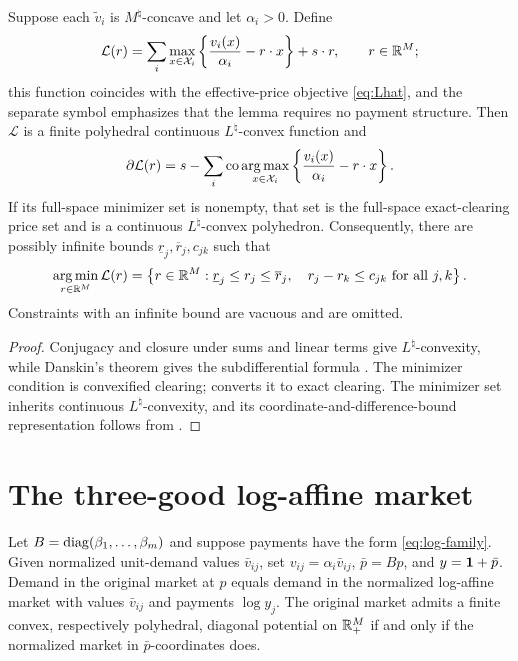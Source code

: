 \begin{lemma}\label{lem:walrasian-price-polyhedron}
Suppose each $\widetilde v_i$ is $M^\natural$-concave and let $\alpha_i>0$. Define
\[
\mathcal L(r)=
\sum_i\max_{x\in\mathcal{X}_i}
\left\{\frac{v_i(x)}{\alpha_i}-r\cdot x\right\}
+s\cdot r,
\qquad r\in\mathbb{R}^M;
\]
this function coincides with the effective-price objective \eqref{eq:Lhat}, and the separate symbol emphasizes that the lemma requires no payment structure. Then $\mathcal L$ is a finite polyhedral continuous $L^\natural$-convex function and
\[
\partial\mathcal L(r)
=s-\sum_i\operatorname{co}\operatorname*{arg\,max}_{x\in\mathcal{X}_i}
\left\{\frac{v_i(x)}{\alpha_i}-r\cdot x\right\}.
\]
If its full-space minimizer set is nonempty, that set is the full-space exact-clearing price set and is a continuous $L^\natural$-convex polyhedron. Consequently, there are possibly infinite bounds $\underline r_j,\overline r_j,c_{jk}$ such that
\[
\operatorname*{arg\,min}_{r\in\mathbb{R}^M}\mathcal L(r)=
\left\{r\in\mathbb{R}^M:
\underline r_j\le r_j\le\overline r_j,
\quad r_j-r_k\le c_{jk}\ \text{for all }j,k
\right\}.
\]
Constraints with an infinite bound are vacuous and are omitted.
\end{lemma}

\begin{proof}
Conjugacy and closure under sums and linear terms give $L^\natural$-convexity, while Danskin's theorem gives the subdifferential formula \citep[Theorems~7.10 and 8.2]{murota2016}. The minimizer condition is convexified clearing;  converts it to exact clearing. The minimizer set inherits continuous $L^\natural$-convexity, and its coordinate-and-difference-bound representation follows from \citet[Theorem~2.2(2)]{moriguchimurota2023}.
\end{proof}

\section{The three-good log-affine market}\label{app:facets}

\begin{lemma}\label{lem:log-normalization}
Let $B=\operatorname{diag}(\beta_1,\ldots,\beta_m)$ and suppose payments have the form \eqref{eq:log-family}. Given normalized unit-demand values $\bar v_{ij}$, set $v_{ij}=\alpha_i\bar v_{ij}$, $\bar p=Bp$, and $y=\mathbf{1}+\bar p$. Demand in the original market at $p$ equals demand in the normalized log-affine market with values $\bar v_{ij}$ and payments $\log y_j$. The original market admits a finite convex, respectively polyhedral, diagonal potential on $\mathbb{R}_+^M$ if and only if the normalized market in $\bar p$-coordinates does.
\end{lemma}

